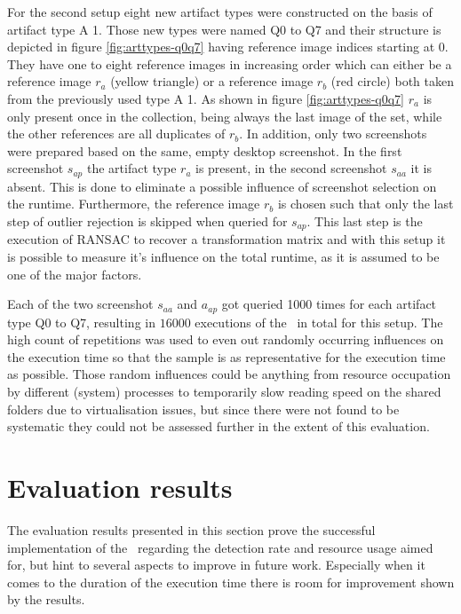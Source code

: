 For the second setup eight new artifact types were constructed on the basis of artifact type A 1. Those new types were named Q0 to Q7 and their structure is depicted in figure \ref{fig:arttypes-q0q7} having reference image indices starting at 0. They have one to eight reference images in increasing order which can either be a reference image $r_a$ (yellow triangle) or a reference image $r_b$ (red circle) both taken from the previously used type A 1. As shown in figure \ref{fig:arttypes-q0q7} $r_a$ is only present once in the collection, being always the last image of the set, while the other references are all duplicates of $r_b$. In addition, only two screenshots were prepared based on the same, empty desktop screenshot. In the first screenshot $s_{ap}$ the artifact type $r_a$ is present, in the second screenshot $s_{aa}$ it is absent. This is done to eliminate a possible influence of screenshot selection on the runtime. Furthermore, the reference image $r_b$ is chosen such that only the last step of outlier rejection is skipped when queried for $s_{ap}$. This last step is the execution of RANSAC to recover a transformation matrix and with this setup it is possible to measure it's influence on the total runtime, as it is assumed to be one of the major factors.

Each of the two screenshot $s_{aa}$ and $a_{ap}$ got queried 1000 times for each artifact type Q0 to Q7, resulting in $16000$ executions of the \vd~in total for this setup. The high count of repetitions was used to even out randomly occurring influences on the execution time so that the sample is as representative for the execution time as possible. Those random influences could be anything from resource occupation by different (system) processes to temporarily slow reading speed on the shared folders due to virtualisation issues, but since there were not found to be systematic they could not be assessed further in the extent of this evaluation.

\section{Evaluation results}\label{sec:eval-results}

The evaluation results presented in this section prove the successful implementation of the \vd~regarding the detection rate and resource usage aimed for, but hint to several aspects to improve in future work. Especially when it comes to the duration of the execution time there is room for improvement shown by the results.

